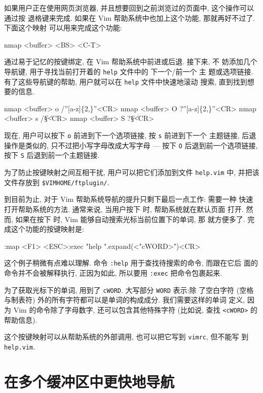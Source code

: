 如果用户正在使用网页浏览器, 并且想要回到之前浏览过的页面中, 这个操作可以通过按
退格键来完成. 如果在 Vim 帮助系统中也加上这个功能, 那就再好不过了. 下面这个映射
可以用来完成这个功能:
\begin{vimcode}
nmap <buffer> <BS> <C-T>
\end{vimcode}

通过易于记忆的按键绑定, 在 Vim 帮助系统中前进或后退. 接下来, 不
妨添加几个导航键, 用于寻找当前打开着的 \texttt{help} 文件中的 下一个/前一个 主
题或选项链接. 有了这些导航键的帮助, 用户就可以在 \texttt{help} 文件中快速地滚动
搜索, 直到找到想要的信息.
\begin{vimcode}
nmap <buffer> o /''[a-z]\{2,\}''<CR>
nmap <buffer> O ?''[a-z]\{2,\}''<CR>
nmap <buffer> s /\|\S\+\|<CR>
nmap <buffer> S ?\|\S\+\|<CR>
\end{vimcode}

现在, 用户可以按下 \texttt{o} 前进到下一个选项链接, 按 \texttt{s} 前进到下一个
主题链接, 后退操作是类似的, 只不过把小写字母改成大写字母 --- 按下 \texttt{O}
后退到前一个选项链接, 按下 \texttt{S} 后退到前一个主题链接.

\begin{warning}
    为了防止按键映射之间互相干扰, 用户可以把它们添加到文件 \texttt{help.vim} 中,
    并把该文件存放到 \verb'$VIMHOME/ftplugin/'.
\end{warning}

到目前为止, 对于 Vim 帮助系统导航的提升只剩下最后一点工作: 需要一种
快速打开帮助系统的方法. 通常来说, 当用户按下  时, 帮助系统就在默认页面
打开. 然而, 如果在按下  时, Vim 能够自动搜索光标当前位置下的单词, 那
就方便多了. 完成这个功能的按键映射是:
\begin{vimcode}
:map <F1> <ESC>:exec "help ".expand(<"cWORD>")<CR>
\end{vimcode}
这个例子稍微有点难以理解. 命令 \texttt{:help} 用于查找待搜索的命令, 而跟在它后
面的命令并不会被解释执行, 正因为如此, 所以要用 \texttt{:exec} 把命令包裹起来.

为了获取光标下的单词, 用到了 \texttt{cWORD}. 大写部分 \texttt{WORD} 表示:除
了空白字符 (空格与制表符) 外的所有字符都可以是单词的构成成分. 我们需要这样的单词
定义, 因为 Vim 的命令除了字母数字, 还可以包含其他特殊字符 (比如说, 查找
\texttt{<cWORD>} 的帮助信息).

这个按键映射可以从帮助系统的外部调用, 也可以把它写到 \texttt{vimrc}, 但不能写
到 \texttt{help.vim}.

\section{在多个缓冲区中更快地导航}
\label{sec:faster_navigation_in_multiple_buffers}

